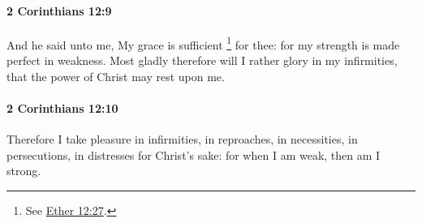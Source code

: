 		\paragraph{2 Corinthians 12:9} %
			\label{2CORINTHIANS-12-9}

			And he said unto me, My grace is sufficient%
				\footnote{%
					See \hyperref[ETHER-12-27]{Ether 12:27}.
					}
			for thee: for my strength is made perfect in weakness.  Most gladly therefore will I rather glory in my infirmities, that the power of Christ may rest upon me.

			\begin{framed}
			\scriptsize
				\begin{compactdesc}
					\item[SBLG] 
				\end{compactdesc}
			\end{framed}

		\paragraph{2 Corinthians 12:10} %
			\label{2CORINTHIANS-12-10}

			Therefore I take pleasure in infirmities, in reproaches, in necessities, in persecutions, in distresses for Christ's sake: for when I am weak, then am I strong.

